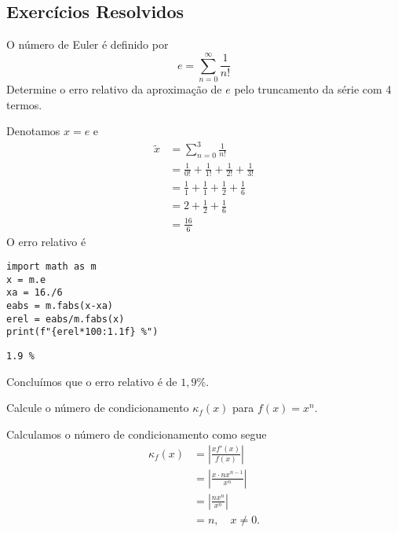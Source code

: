 \subsection{Exercícios Resolvidos}

\begin{exeresol}
  O número de Euler é definido por
  \begin{equation}
    e = \sum_{n=0}^\infty \frac{1}{n!}
  \end{equation}
  Determine o erro relativo da aproximação de $e$ pelo truncamento da série com 4 termos.
\end{exeresol}
\begin{resol}
  Denotamos $x = e$ e
  \begin{align}
    \tilde{x} &= \sum_{n=0}^3\frac{1}{n!}\\
              &= \frac{1}{0!} + \frac{1}{1!} + \frac{1}{2!} + \frac{1}{3!}\\
              &= \frac{1}{1} + \frac{1}{1} + \frac{1}{2} + \frac{1}{6}\\
              &= 2 + \frac{1}{2} + \frac{1}{6}\\
              &= \frac{16}{6}
  \end{align}
  O erro relativo é

\begin{lstlisting}
import math as m
x = m.e
xa = 16./6
eabs = m.fabs(x-xa)
erel = eabs/m.fabs(x)
print(f"{erel*100:1.1f} %")
\end{lstlisting}

\begin{verbatim}
1.9 %
\end{verbatim}

Concluímos que o erro relativo é de $1,9\%$.
\end{resol}

\begin{exeresol}
  Calcule o número de condicionamento $\kappa_f(x)$ para $f(x) = x^n$.
\end{exeresol}
\begin{resol}
  Calculamos o número de condicionamento como segue
  \begin{align}
    \kappa_f(x) &= \left|\frac{xf'(x)}{f(x)}\right|\\
                &= \left|\frac{x\cdot nx^{n-1}}{x^n}\right|\\
                &= \left|\frac{nx^n}{x^n}\right|\\
                &= n,\quad x\neq 0.
  \end{align}
\end{resol}

